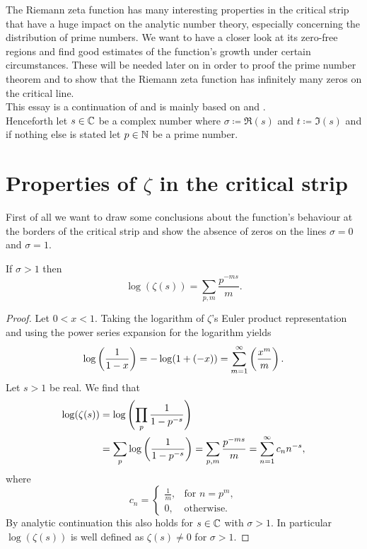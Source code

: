 The Riemann zeta function has many interesting properties in the critical strip that have a huge impact on the analytic number theory, especially concerning the distribution of prime numbers. We want to have a closer look at its zero-free regions and find good estimates of the function's growth under certain circumstances. These will be needed later on in order to proof the prime number theorem and to show that the Riemann zeta function has infinitely many zeros on the critical line. \\
This essay is a continuation of \cite{Jesacher2016} and is mainly based on \cite{Ahlfors1966} and \cite{Titchmarsh1986}. \\
Henceforth let $s \in \mathbb{C}$ be a complex number where $\sigma \coloneqq \Re(s)$ and $t \coloneqq \Im(s)$ and if nothing else is stated let $p \in \mathbb{N}$ be a prime number.


\section{Properties of $\zeta$ in the critical strip}
First of all we want to draw some conclusions about the function's behaviour at the borders of the critical strip and show the absence of zeros on the lines $\sigma = 0$ and $\sigma = 1$.


\begin{lemma}\label{lem:LogEulerProd}
	If $\sigma > 1$ then
\begin{equation*}
	\log(\zeta(s)) = \sum _{p,m} \frac{p^{-ms}}{m}.
\end{equation*}
\end{lemma}
\begin{proof}
	Let $0 < x < 1$. Taking the logarithm of $\zeta$'s Euler product representation and using the power series expansion for the logarithm yields
\begin{equation*}
	\log\left(\frac{1}{1 - x}\right) = -\log(1 + (-x)) = \sum _{m = 1} ^\infty \left(\frac{x^m}{m}\right).
\end{equation*}
	Let $s > 1$ be real. We find that
\begin{equation*}
\begin{aligned}	
	\log(\zeta(s)) 
		&= \log\left(\prod _p \frac{1}{1 - p^{-s}}\right) \\
		&= \sum _p \log\left(\frac{1}{1 - p^{-s}}\right)
		= \sum _{p,m} \frac{p^{-ms}}{m} = \sum _{n=1} ^{\infty} c_n n^{-s},
\end{aligned}
\end{equation*}
	where
\begin{equation*}
    c_n =
    \left\{
    	\begin{array}{ll}
        	\frac{1}{m}, & \text{for } n = p^m, \\
        	0, & \text{otherwise.}
        \end{array}
	\right.
\end{equation*}
	By analytic continuation this also holds for $s \in \mathbb{C}$ with $\sigma > 1$. In particular $\log(\zeta(s))$ is well defined as $\zeta(s) \neq 0$ for $\sigma > 1$.
\end{proof}


